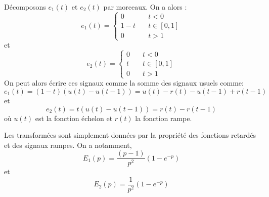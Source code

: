 \question{}
Décomposons $e_1(t)$ et $e_2(t)$ par morceaux. On a alors :
\[
e_1(t)=
\begin{cases}
    0&\quad t<0\\
    1-t&\quad t\in[0,1]\\
    0&\quad t>1
\end{cases}
\]
et
\[
e_2(t)=
\begin{cases}
    0&\quad t<0\\
    t&\quad t\in[0,1]\\
    0&\quad t>1
\end{cases}
\]
On peut alors écrire ces signaux comme la somme des signaux usuels comme:
\[
    e_1(t)=(1-t)\left(u(t)-u(t-1)\right)=u(t)-r(t)-u(t-1)+r(t-1)
\]
et
\[
    e_2(t)=t\left(u(t)-u(t-1)\right)=r(t)-r(t-1)
\]
où $u(t)$ est la fonction échelon et $r(t)$ la fonction rampe.

\question{}
Les transformées sont simplement données par la propriété des fonctions 
retardés et des signaux rampes. On a notamment,
\[
    E_1(p)=\dfrac{(p-1)}{p^2}\left(1-e^{-p}\right)
\]
et
\[
    E_2(p)=\dfrac{1}{p^2}\left(1-e^{-p}\right)
\]


